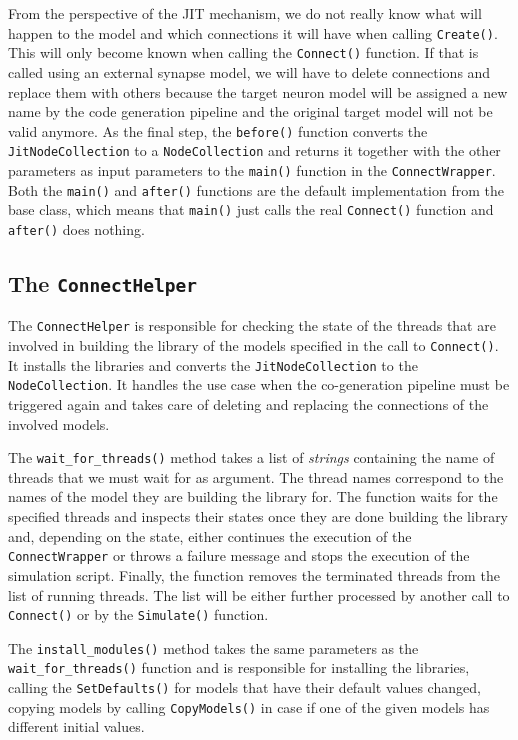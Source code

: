 From the perspective of the JIT mechanism, we do not really know what will happen to the model and which connections it will have when calling \texttt{Create()}. This will only become known when calling the \texttt{Connect()} function. If that is called using an external synapse model, we will have to delete connections and replace them with others because the target neuron model will be assigned a new name by the code generation pipeline and the original target model will not be valid anymore. As the final step, the \texttt{before()} function converts the \texttt{JitNodeCollection} to a \texttt{NodeCollection} and returns it together with the other parameters as input parameters to the \texttt{main()} function in the \texttt{ConnectWrapper}. Both the \texttt{main()} and \texttt{after()} functions are the default implementation from the base class, which means that \texttt{main()} just calls the real \texttt{Connect()} function and \texttt{after()} does nothing.

\subsection{The \texttt{ConnectHelper}}

The \texttt{ConnectHelper} is responsible for checking the state of the threads that are involved in building the library of the models specified in the call to \texttt{Connect()}. It installs the libraries and converts the \texttt{JitNodeCollection} to the \texttt{NodeCollection}. It handles the use case when the co-generation pipeline must be triggered again and takes care of deleting and replacing the connections of the involved models.

The \texttt{wait\_for\_threads()} method takes a list of \emph{strings} containing the name of threads that we must wait for as argument. The thread names correspond to the names of the model they are building the library for. The function waits for the specified threads and inspects their states once they are done building the library and, depending on the state, either continues the execution of the \texttt{ConnectWrapper} or throws a failure message and stops the execution of the simulation script. Finally, the function removes the terminated threads from the list of running threads. The list will be either further processed by another call to \texttt{Connect()} or by the \texttt{Simulate()} function.

The \texttt{install\_modules()} method takes the same parameters as the  \texttt{wait\_for\_threads()} function and is responsible for installing the libraries, calling the \texttt{SetDefaults()} for models that have their default values changed, copying models by calling \texttt{CopyModels()} in case if one of the given models has different initial values.

